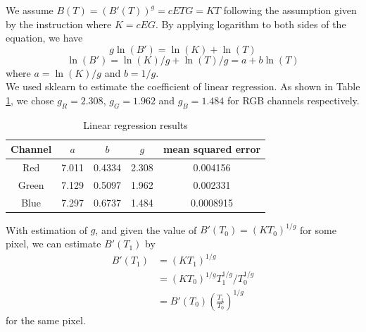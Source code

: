 \documentclass[10pt,twocolumn,letterpaper]{article}
\begin{document}
We assume $B(T) = (B'(T))^g = cETG = KT  $ following the assumption given by the instruction where $K = cEG$. By applying logarithm to both sides of the equation, we have 
$$ g\ln(B') = \ln(K) + \ln(T) $$
$$ \ln(B') = \ln(K)/g + \ln(T)/g = a + b\ln(T) $$ where $a = \ln(K)/g$ and $b=1/g$. \\

We used sklearn to estimate the coefficient of linear regression. As shown in Table \ref{tab:linear}, we chose $g_R = 2.308$, $g_G = 1.962$ and $g_B = 1.484$ for RGB channels respectively.\\


\begin{table}[]
\caption{Linear regression results}
\centering
\begin{tabular}{|c|c|c|c|c|}
\hline
Channel &  $a$  &  $b$ & $g$ & mean squared error  \\
\hline

Red & 7.011 & 0.4334 & 2.308 & 0.004156 \\
\hline
Green & 7.129& 0.5097 & 1.962 & 0.002331\\
\hline
Blue & 7.297 & 0.6737 & 1.484 & 0.0008915\\
\hline

 \hline

\end{tabular}
\label{tab:linear}
\end{table}


With estimation of $g$, and given the value of $B'(T_0) = (KT_0)^{1/g}$ for some pixel, we can estimate $B'(T_1)$ by 
\begin{equation}
\begin{aligned}
B'(T_1)     &=  (KT_1)^{1/g}\\
            &=  (KT_0)^{1/g}T_1^{1/g}/T_0^{1/g}\\
            &=  B'(T_0) (\frac{T_1}{T_0})^{1/g}
\end{aligned}
\end{equation}
for the same pixel.





\end{document}
